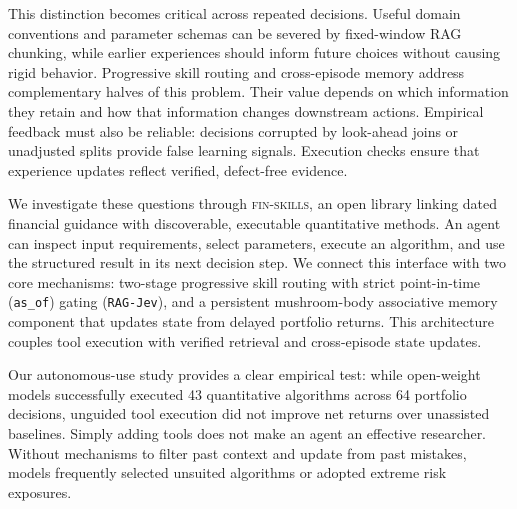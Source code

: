 \documentclass[11pt]{article}
\begin{document}
This distinction becomes critical across repeated decisions. Useful domain conventions
and parameter schemas can be severed by fixed-window RAG chunking, while earlier experiences
should inform future choices without causing rigid behavior. Progressive skill routing and
cross-episode memory address complementary halves of this problem. Their value depends
on which information they retain and how that information changes downstream actions.
Empirical feedback must also be reliable: decisions corrupted by look-ahead joins or
unadjusted splits provide false learning signals. Execution checks ensure that
experience updates reflect verified, defect-free evidence.

We investigate these questions through \textsc{fin-skills}, an open library linking
dated financial guidance with discoverable, executable quantitative methods. An agent
can inspect input requirements, select parameters, execute an algorithm, and use the
structured result in its next decision step. We connect this interface with two core
mechanisms: two-stage progressive skill routing with strict point-in-time (\texttt{as\_of})
gating (\texttt{RAG-Jev}), and a persistent mushroom-body associative memory component that
updates state from delayed portfolio returns. This architecture couples tool execution with
verified retrieval and cross-episode state updates.

Our autonomous-use study provides a clear empirical test: while open-weight models
successfully executed 43 quantitative algorithms across 64 portfolio decisions,
unguided tool execution did not improve net returns over unassisted baselines. Simply
adding tools does not make an agent an effective researcher. Without mechanisms to
filter past context and update from past mistakes, models frequently selected unsuited
algorithms or adopted extreme risk exposures.
\end{document}

